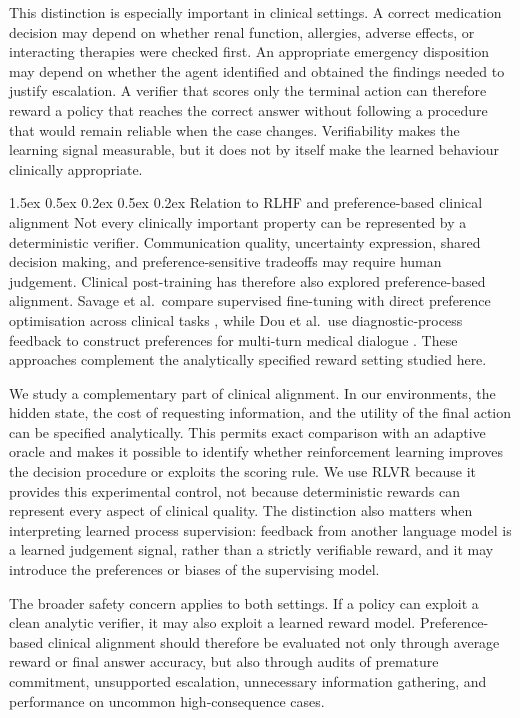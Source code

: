 \documentclass{article}
\makeatletter
\renewcommand{\paragraph}{%
  \@startsection{paragraph}{4}{\z@}%
                {1.5ex \@plus 0.5ex \@minus 0.2ex}%
                {0.5ex \@plus 0.2ex}%
                {\normalsize\bf}}
\makeatother
\begin{document}
This distinction is especially important in clinical settings. A correct
medication decision may depend on whether renal function, allergies, adverse
effects, or interacting therapies were checked first. An appropriate emergency
disposition may depend on whether the agent identified and obtained the findings
needed to justify escalation. A verifier that scores only the terminal action
can therefore reward a policy that reaches the correct answer without following
a procedure that would remain reliable when the case changes. Verifiability
makes the learning signal measurable, but it does not by itself make the learned
behaviour clinically appropriate.

\paragraph{Relation to RLHF and preference-based clinical alignment}
Not every clinically important property can be represented by a
deterministic verifier. Communication quality, uncertainty expression,
shared decision making, and preference-sensitive tradeoffs may require
human judgement. Clinical post-training has therefore also explored
preference-based alignment. Savage et al.\ compare supervised
fine-tuning with direct preference optimisation across clinical tasks
\citep{savage2025clinicaldpo}, while Dou et al.\ use diagnostic-process
feedback to construct preferences for multi-turn medical dialogue
\citep{dou2024physicianlogic}. These approaches complement the
analytically specified reward setting studied here.

We study a complementary part of clinical alignment. In our environments, the
hidden state, the cost of requesting information, and the utility of the final
action can be specified analytically. This permits exact comparison with an
adaptive oracle and makes it possible to identify whether reinforcement
learning improves the decision procedure or exploits the scoring rule. We use
RLVR because it provides this experimental control, not because deterministic
rewards can represent every aspect of clinical quality. The distinction also
matters when interpreting learned process supervision: feedback from another
language model is a learned judgement signal, rather than a strictly verifiable
reward, and it may introduce the preferences or biases of the supervising
model.

The broader safety concern applies to both settings. If a policy can exploit a
clean analytic verifier, it may also exploit a learned reward model. Preference-based clinical alignment should therefore be evaluated not only through average
reward or final answer accuracy, but also through audits of premature
commitment, unsupported escalation, unnecessary information gathering, and
performance on uncommon high-consequence cases.
\end{document}
